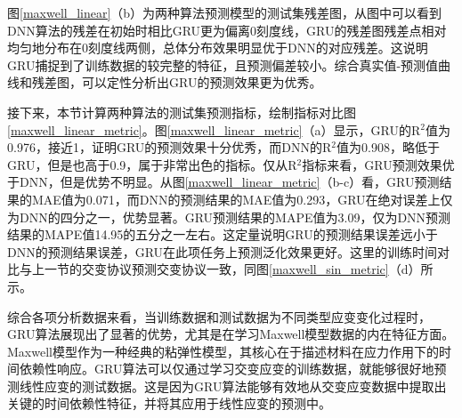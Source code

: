 图\ref{maxwell_linear}（b）为两种算法预测模型的测试集残差图，从图中可以看到DNN算法的残差在初始时相比GRU更为偏离0刻度线，GRU的残差图残差点相对均匀地分布在0刻度线两侧，总体分布效果明显优于DNN的对应残差。这说明GRU捕捉到了训练数据的较完整的特征，且预测偏差较小。综合真实值-预测值曲线和残差图，可以定性分析出GRU的预测效果更为优秀。

接下来，本节计算两种算法的测试集预测指标，绘制指标对比图\ref{maxwell_linear_metric}。图\ref{maxwell_linear_metric}（a）显示，GRU的R$^2$值为0.976，接近1，证明GRU的预测效果十分优秀，而DNN的R$^2$值为0.908，略低于GRU，但是也高于0.9，属于非常出色的指标。仅从R$^2$指标来看，GRU预测效果优于DNN，但是优势不明显。从图\ref{maxwell_linear_metric}（b-c）看，GRU预测结果的MAE值为0.071，而DNN的预测结果的MAE值为0.293，GRU在绝对误差上仅为DNN的四分之一，优势显著。GRU预测结果的MAPE值为3.09，仅为DNN预测结果的MAPE值14.95的五分之一左右。这定量说明GRU的预测结果误差远小于DNN的预测结果误差，GRU在此项任务上预测泛化效果更好。这里的训练时间对比与上一节的交变协议预测交变协议一致，同图\ref{maxwell_sin_metric}（d）所示。


综合各项分析数据来看，当训练数据和测试数据为不同类型应变变化过程时，GRU算法展现出了显著的优势，尤其是在学习Maxwell模型数据的内在特征方面。Maxwell模型作为一种经典的粘弹性模型，其核心在于描述材料在应力作用下的时间依赖性响应。GRU算法可以仅通过学习交变应变的训练数据，就能够很好地预测线性应变的测试数据。这是因为GRU算法能够有效地从交变应变数据中提取出关键的时间依赖性特征，并将其应用于线性应变的预测中。
